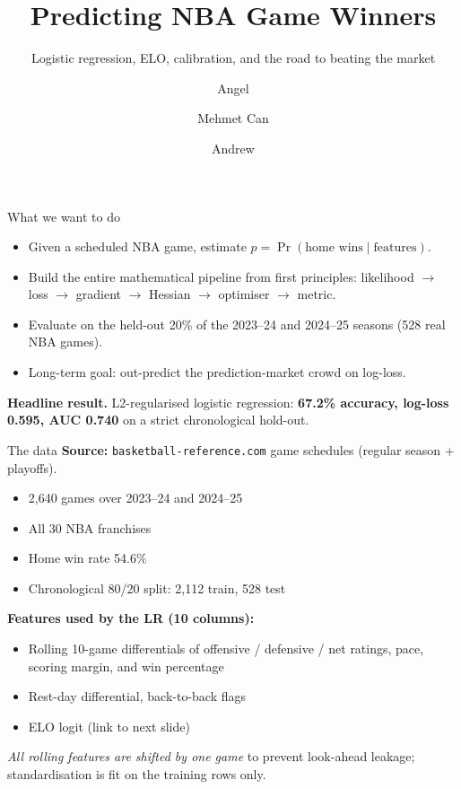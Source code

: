 \documentclass[10pt,aspectratio=169]{beamer}
\title{Predicting NBA Game Winners}
\subtitle{Logistic regression, ELO, calibration, and the road to beating the market}
\author{Angel \and Mehmet Can \and Andrew}
\institute{Math 17 --- Mathematics for Machine Learning}
\date{}
\begin{document}
\begin{frame}
  \titlepage
\end{frame}

\begin{frame}{What we want to do}
  \begin{itemize}
    \item Given a scheduled NBA game, estimate
      $p = \Pr(\text{home wins} \mid \text{features})$.
    \item Build the entire mathematical pipeline from first principles:
      likelihood $\to$ loss $\to$ gradient $\to$ Hessian $\to$
      optimiser $\to$ metric.
    \item Evaluate on the held-out 20\% of the 2023--24 and 2024--25
      seasons (528 real NBA games).
    \item Long-term goal: out-predict the prediction-market crowd on log-loss.
  \end{itemize}

  \vfill
  \textbf{Headline result.} L2-regularised logistic regression: \textbf{67.2\%
  accuracy, log-loss 0.595, AUC 0.740} on a strict chronological hold-out.
\end{frame}

\begin{frame}{The data}
  \textbf{Source:} \texttt{basketball-reference.com} game schedules
  (regular season + playoffs).
  \begin{itemize}
    \item 2{,}640 games over 2023--24 and 2024--25
    \item All 30 NBA franchises
    \item Home win rate 54.6\%
    \item Chronological 80/20 split: 2{,}112 train, 528 test
  \end{itemize}

  \textbf{Features used by the LR (10 columns):}
  \begin{itemize}
    \item Rolling 10-game differentials of offensive / defensive / net
      ratings, pace, scoring margin, and win percentage
    \item Rest-day differential, back-to-back flags
    \item ELO logit (link to next slide)
  \end{itemize}

  \emph{All rolling features are shifted by one game} to prevent
  look-ahead leakage; standardisation is fit on the training rows
  only.
\end{frame}
\end{document}
